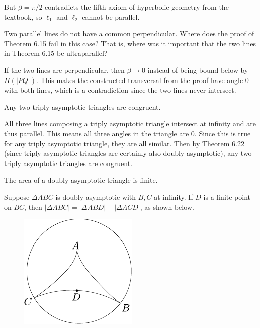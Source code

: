 \documentclass[twoside,10pt]{article}
\begin{document}
But $\beta=\pi/2$ contradicts the fifth axiom of hyperbolic geometry from the textbook, so $\ell_1$ and $\ell_2$ cannot be parallel.

\newpage

\begin{exer}[6.18]
Two parallel lines do not have a common perpendicular. Where does the proof of Theorem 6.15 fail in this case? That is, where was it important that the two lines in Theorem 6.15 be ultraparallel?
\end{exer}

If the two lines are perpendicular, then $\beta \to 0$ instead of being bound below by $\Pi(|PQ|)$. This makes the constructed transversal from the proof have angle 0 with both lines, which is a contradiction since the two lines never intersect.

\newpage

\begin{exer}[6.23]
Any two triply asymptotic triangles are congruent.
\end{exer}

All three lines composing a triply asymptotic triangle intersect at infinity and are thus parallel. This means all three angles in the triangle are 0. Since this is true for any triply asymptotic triangle, they are all similar. Then by Theorem 6.22 (since triply asymptotic triangles are certainly also doubly asymptotic), any two triply asymptotic triangles are congruent.

\newpage

\begin{exer}[6.25]
	The area of a doubly asymptotic triangle is finite.
\end{exer}

Suppose $\Delta ABC$ is doubly asymptotic with $B,C$ at infinity. If $D$ is a finite point on $BC$, then $|\Delta ABC| = |\Delta ABD| + |\Delta ACD|$, as shown below.

\begin{figure}[H]
	\centering
	\includegraphics[scale=1.5]{fig/25.pdf}
\end{figure}
\end{document}
